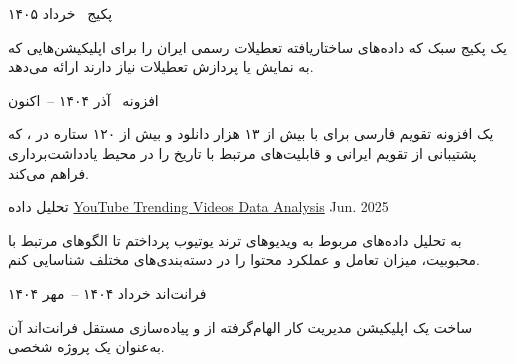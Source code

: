 \begin{cventries}
\cventry
{پکیج~}
{\href{https://www.npmjs.com/package/persian-holidays}{}}
{}
{خرداد ۱۴۰۵}
{
  \begin{cvitems}
    \item {یک پکیج سبک که داده‌های ساختاریافته تعطیلات رسمی ایران را برای اپلیکیشن‌هایی که به نمایش یا پردازش تعطیلات نیاز دارند ارائه می‌دهد.}
    \item {}
  \end{cvitems}
}

\cventry
{افزونه~}
{\href{https://github.com/karfekr/obsidian-persian-calendar}{}}
{}
{آذر ۱۴۰۴ --\ اکنون}
{
  \begin{cvitems}
    \item {یک افزونه تقویم فارسی برای  با بیش از ۱۳ هزار دانلود و بیش از ۱۲۰ ستاره در ، که پشتیبانی از تقویم ایرانی و قابلیت‌های مرتبط با تاریخ را در محیط یادداشت‌برداری فراهم می‌کند.}
    \item {}
    \item {}
  \end{cvitems}
}

\cventry
{تحلیل داده}
{\href{https://github.com/NedaMani/youtube_trending_analysis}{YouTube Trending Videos Data Analysis}}
{}
{Jun. 2025}
{
  \begin{cvitems}
    \item {به تحلیل داده‌های مربوط به ویدیوهای ترند یوتیوب پرداختم تا الگوهای مرتبط با محبوبیت، میزان تعامل و عملکرد محتوا را در دسته‌بندی‌های مختلف شناسایی کنم.}
    \item {}
  \end{cvitems}
}

\cventry
{فرانت‌اند}
{\href{https://github.com/PhoenixTask/WebApp}{}}
{}
{خرداد ۱۴۰۴ --\ مهر ۱۴۰۴}
{
  \begin{cvitems}
    \item {ساخت یک اپلیکیشن مدیریت کار الهام‌گرفته از  و پیاده‌سازی مستقل فرانت‌اند آن به‌عنوان یک پروژه شخصی.}
    \item {}
    \item {}
  \end{cvitems}
}


\end{cventries}
